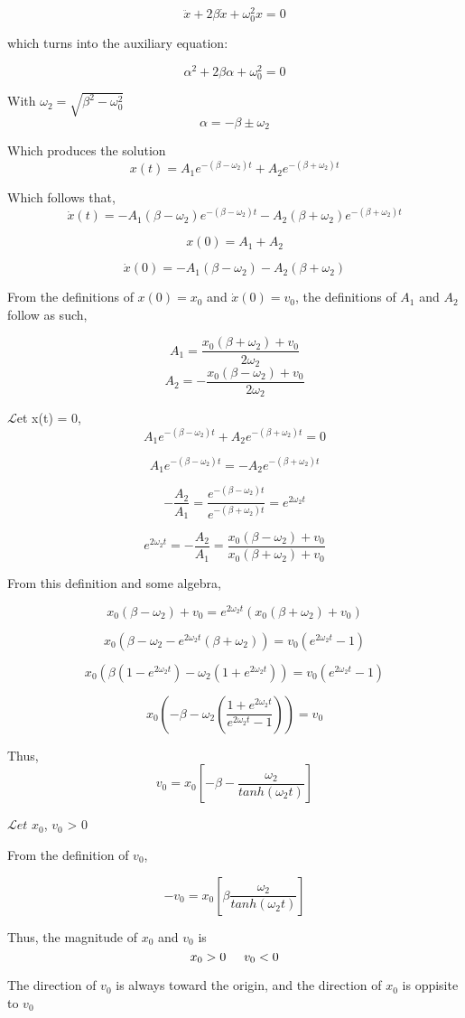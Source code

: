 \documentclass[12pt]{article}
\begin{document}
$$
\ddot{x} + 2 \beta \dot{x} + \omega_0^2 x = 0
$$

which turns into the auxiliary equation:

$$
\alpha^2 + 2 \beta \alpha + \omega_0^2 = 0
$$

With $\omega_2 = \sqrt{\beta^2 - \omega_0^2}$
$$
\alpha = - \beta \pm \omega_2
$$

Which produces the solution
$$
x(t) = A_1 e^{-(\beta - \omega_2) t} + A_2 e^{-(\beta + \omega_2) t}
$$

Which follows that,
$$
\dot{x}(t) = -A_1 (\beta - \omega_2) e^{-(\beta - \omega_2) t} - A_2 (\beta + \omega_2) e^{-(\beta + \omega_2) t}
$$

$$
x(0) = A_1 + A_2
$$

$$
\dot{x}(0) = - A_1 ( \beta - \omega_2 ) - A_2 ( \beta + \omega_2 )
$$

From the definitions of $x(0) = x_0$ and $\dot{x}(0) = v_0$, the definitions of $A_1$ and $A_2$ follow as such,

$$
A_1 = \frac{x_0 ( \beta + \omega_2 ) + v_0}{2 \omega_2}
$$
$$
A_2 = -\frac{x_0 ( \beta - \omega_2 ) + v_0}{2 \omega_2}
$$


$\mathscr{L}$et x(t) = 0,
$$
A_1 e^{-(\beta - \omega_2) t} + A_2 e^{-(\beta + \omega_2) t} = 0 
$$

$$
A_1 e^{-(\beta - \omega_2) t} = - A_2 e^{-(\beta + \omega_2) t}
$$

$$
- \frac{A_2}{A_1} = \frac{e^{-(\beta - \omega_2) t}}{e^{-(\beta + \omega_2) t}} = e^{2 \omega_2 t}
$$

$$
e^{2 \omega_2 t} = - \frac{A_2}{A_1} = \frac{x_0 ( \beta - \omega_2 ) + v_0}{x_0 ( \beta + \omega_2 ) + v_0}
$$

From this definition and some algebra,

$$
x_0 ( \beta - \omega_2 ) + v_0 = e^{2 \omega_2 t} ( x_0 ( \beta + \omega_2 ) + v_0 )
$$

$$
x_0 ( \beta - \omega_2 - e^{2 \omega_2 t} (\beta + \omega_2) ) = v_0 ( e^{2 \omega_2 t} - 1 )
$$

$$
x_0 ( \beta ( 1 - e^{2 \omega_2 t} ) - \omega_2 (1 + e^{2 \omega_2 t} ) ) = v_0 ( e^{2 \omega_2 t} - 1 )
$$

$$
x_0 ( - \beta - \omega_2 (\frac{1 + e^{2 \omega_2 t}}{e^{2 \omega_2 t} -1})) = v_0
$$

Thus,
$$
v_0 = x_0 [-\beta - \frac{\omega_2}{tanh(\omega_2 t)}]
$$

$\mathscr{L}et$ $x_0$, $v_0$ \in {} > 0

From the definition of $v_0$,

$$
- v_0 = x_0 [\beta \frac{\omega_2}{tanh(\omega_2 t)}]
$$

Thus, the magnitude of $x_0$ and $v_0$ is
$$
x_0 > 0 \hspace{0.5cm} v_0 < 0
$$

The direction of $v_0$ is always toward the origin, and the direction of $x_0$ is oppisite to $v_0$
\end{document}
